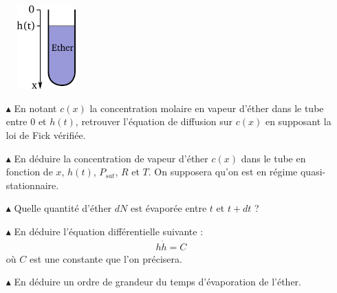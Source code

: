 \documentclass{report}
\begin{document}
\begin{figure}[h!]
\centering
  \includegraphics[width=0.2\textwidth]{ether2.pdf}
\end{figure}

\begin{itemize}

	\item[$\blacktriangle$] En notant $c(x)$ la concentration molaire en vapeur d'éther dans le tube entre $0$ et $h(t)$, retrouver l'équation de diffusion sur $c(x)$ en supposant la loi de Fick vérifiée.
	
	\item[$\blacktriangle$] En déduire la concentration de vapeur d'éther $c(x)$ dans le tube en fonction de $x$, $h(t)$, $P_{sat}$, $R$ et $T$. On supposera qu'on est en régime quasi-stationnaire.
	
	\item[$\blacktriangle$] Quelle quantité d'éther $dN$ est évaporée entre $t$ et $t+dt$ ? 
	
	\item[$\blacktriangle$] En déduire l'équation différentielle suivante :
	\begin{align*}
		h\dot{h}=C		
	\end{align*}
	où $C$ est une constante que l'on précisera.
	
	\item[$\blacktriangle$] En déduire un ordre de grandeur du temps d'évaporation de l'éther.

\end{itemize}
\end{document}

